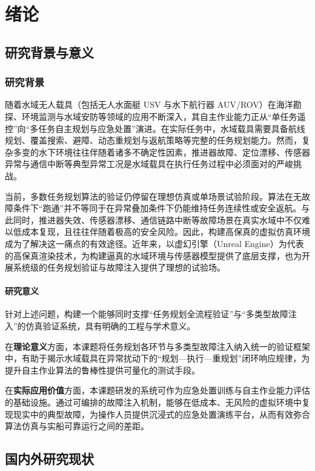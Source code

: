 \chapter{绪论}
\section{研究背景与意义}
\subsection{研究背景}
随着水域无人载具（包括无人水面艇 USV 与水下航行器 AUV/ROV）在海洋勘探、环境监测与水域安防等领域的应用不断深入，其自主作业能力正从“单任务遥控”向“多任务自主规划与应急处置”演进。在实际任务中，水域载具需要具备航线规划、覆盖搜索、避障、动态重规划与返航策略等完整的任务规划能力。然而，复杂多变的水下环境往往伴随着诸多不确定性因素，推进器故障、定位漂移、传感器异常与通信中断等典型异常工况是水域载具在执行任务过程中必须面对的严峻挑战。

当前，多数任务规划算法的验证仍停留在理想仿真或单场景试验阶段。算法在无故障条件下“跑通”并不等同于在异常叠加条件下仍能维持任务连续性或安全返航。与此同时，推进器失效、传感器漂移、通信链路中断等故障场景在真实水域中不仅难以低成本复现，且往往伴随着极高的安全风险。因此，构建高保真的虚拟仿真环境成为了解决这一痛点的有效途径。近年来，以虚幻引擎（Unreal Engine）为代表的高保真渲染技术，为构建逼真的水域环境与传感器模型提供了底层支撑，也为开展系统级的任务规划验证与故障注入提供了理想的试验场。

\subsubsection{研究意义}

针对上述问题，构建一个能够同时支撑“任务规划全流程验证”与“多类型故障注入”的仿真验证系统，具有明确的工程与学术意义。

在\textbf{理论意义}方面，本课题将任务规划各环节与多类型故障注入纳入统一的验证框架中，有助于揭示水域载具在异常扰动下的“规划—执行—重规划”闭环响应规律，为提升自主作业算法的鲁棒性提供可量化的测试手段。

在\textbf{实际应用价值}方面，本课题研发的系统可作为应急处置训练与自主作业能力评估的基础设施。通过可编排的故障注入机制，能够在低成本、无风险的虚拟环境中复现现实中的典型故障，为操作人员提供沉浸式的应急处置演练平台，从而有效弥合算法仿真与实船可靠运行之间的差距。

\section{国内外研究现状}

